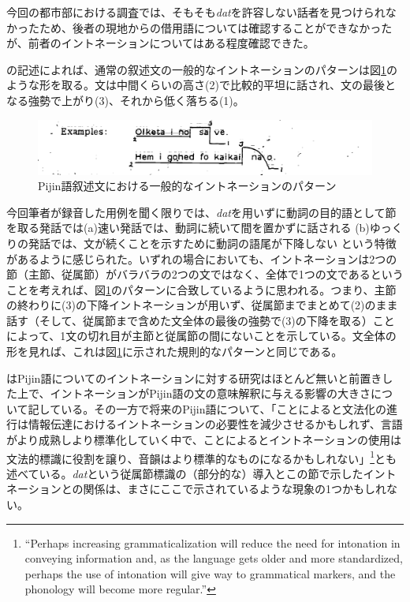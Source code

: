 今回の都市部における調査では、そもそも\textit{dat}を許容しない話者を見つけられなかったため、後者の現地からの借用語については確認することができなかったが、前者のイントネーションについてはある程度確認できた。

\cite{eric}の記述によれば、通常の叙述文の一般的なイントネーションのパターンは図\ref{fig:intonation}のような形を取る。文は中間くらいの高さ(2)で比較的平坦に話され、文の最後となる強勢で上がり(3)、それから低く落ちる(1)。

\begin{figure}[ht]
  \includegraphics[width=15cm]{./intonation.png}
  \caption{Pijin語叙述文における一般的なイントネーションのパターン\cite[10]{eric}}
  \label{fig:intonation}
\end{figure}

今回筆者が録音した用例を聞く限りでは、\textit{dat}を用いずに動詞の目的語として節を取る発話では(a)速い発話では、動詞に続いて間を置かずに話される (b)ゆっくりの発話では、文が続くことを示すために動詞の語尾が下降しない という特徴があるように感じられた。いずれの場合においても、イントネーションは2つの節（主節、従属節）がバラバラの2つの文ではなく、全体で1つの文であるということを考えれば、図\ref{fig:intonation}のパターンに合致しているように思われる。つまり、主節の終わりに(3)の下降イントネーションが用いず、従属節までまとめて(2)のまま話す（そして、従属節まで含めた文全体の最後の強勢で(3)の下降を取る）ことによって、1文の切れ目が主節と従属節の間にないことを示している。文全体の形を見れば、これは図\ref{fig:intonation}に示された規則的なパターンと同じである。

\cite{phonology}はPijin語についてのイントネーションに対する研究はほとんど無いと前置きした上で、イントネーションがPijin語の文の意味解釈に与える影響の大きさについて記している。その一方で将来のPijin語について、「ことによると文法化の進行は情報伝達におけるイントネーションの必要性を減少させるかもしれず、言語がより成熟しより標準化していく中で、ことによるとイントネーションの使用は文法的標識に役割を譲り、音韻はより標準的なものになるかもしれない」\footnote{
``Perhaps increasing grammaticalization will reduce the need for intonation in conveying information and, as the language gets older and more standardized, perhaps the use of intonation will give way to grammatical markers, and the phonology will become more regular.''\citep{phonology}}とも述べている。\textit{dat}という従属節標識の（部分的な）導入とこの節で示したイントネーションとの関係は、まさにここで示されているような現象の1つかもしれない。

